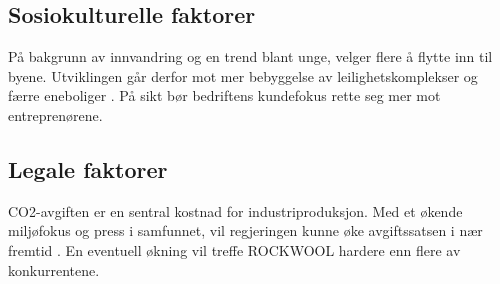 \subsection{Sosiokulturelle faktorer} 
På bakgrunn av innvandring og en trend blant unge, velger flere å flytte inn til byene. Utviklingen går derfor mot mer bebyggelse av leilighetskomplekser og færre eneboliger \cite{Urbanisering}. På sikt bør bedriftens kundefokus rette seg mer mot entreprenørene.

\subsection{Legale faktorer}
CO2-avgiften \cite{Finansdepartementet2018} er en sentral kostnad for industriproduksjon. Med et økende miljøfokus og press i samfunnet, vil regjeringen kunne øke avgiftssatsen i nær fremtid \cite{DagbladetCO2}. En eventuell økning vil treffe ROCKWOOL hardere enn flere av konkurrentene.





